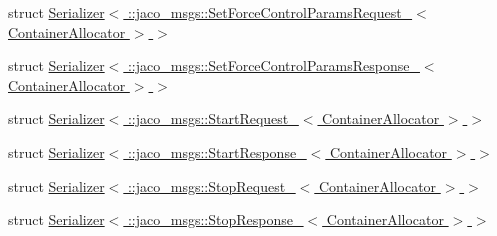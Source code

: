 \begin{DoxyCompactItemize}
\item 
struct \hyperlink{structros_1_1serialization_1_1Serializer_3_01_1_1jaco__msgs_1_1SetForceControlParamsRequest___3_01ContainerAllocator_01_4_01_4}{Serializer$<$ \+::jaco\+\_\+msgs\+::\+Set\+Force\+Control\+Params\+Request\+\_\+$<$ Container\+Allocator $>$ $>$}
\item 
struct \hyperlink{structros_1_1serialization_1_1Serializer_3_01_1_1jaco__msgs_1_1SetForceControlParamsResponse___3_01ContainerAllocator_01_4_01_4}{Serializer$<$ \+::jaco\+\_\+msgs\+::\+Set\+Force\+Control\+Params\+Response\+\_\+$<$ Container\+Allocator $>$ $>$}
\item 
struct \hyperlink{structros_1_1serialization_1_1Serializer_3_01_1_1jaco__msgs_1_1StartRequest___3_01ContainerAllocator_01_4_01_4}{Serializer$<$ \+::jaco\+\_\+msgs\+::\+Start\+Request\+\_\+$<$ Container\+Allocator $>$ $>$}
\item 
struct \hyperlink{structros_1_1serialization_1_1Serializer_3_01_1_1jaco__msgs_1_1StartResponse___3_01ContainerAllocator_01_4_01_4}{Serializer$<$ \+::jaco\+\_\+msgs\+::\+Start\+Response\+\_\+$<$ Container\+Allocator $>$ $>$}
\item 
struct \hyperlink{structros_1_1serialization_1_1Serializer_3_01_1_1jaco__msgs_1_1StopRequest___3_01ContainerAllocator_01_4_01_4}{Serializer$<$ \+::jaco\+\_\+msgs\+::\+Stop\+Request\+\_\+$<$ Container\+Allocator $>$ $>$}
\item 
struct \hyperlink{structros_1_1serialization_1_1Serializer_3_01_1_1jaco__msgs_1_1StopResponse___3_01ContainerAllocator_01_4_01_4}{Serializer$<$ \+::jaco\+\_\+msgs\+::\+Stop\+Response\+\_\+$<$ Container\+Allocator $>$ $>$}
\end{DoxyCompactItemize}
